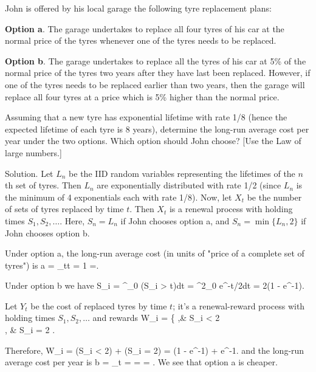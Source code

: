 \begin{exercise}
John is offered by his local garage the following tyre replacement plans: 

{\bf Option a}. The garage undertakes to replace all four tyres of his car at the normal price of the tyres whenever one of the tyres needs to be replaced. 

{\bf Option b}. The garage undertakes to replace all the tyres of his car at 5\% of the normal price of the tyres two years after they have last been replaced. However, if one of the tyres needs to be replaced earlier than two years, then the garage will replace all four tyres at a price which is 5\% higher than the normal price. 

Assuming that a new tyre has exponential lifetime with rate 1/8 (hence the expected lifetime of each tyre is 8 years), determine the long-run average cost per year under the two options. Which option should John choose? [Use the Law of large numbers.]
\end{exercise}


Solution. Let $L_n$ be the IID random variables representing the lifetimes of the $n$th set of tyres. Then $L_n$ are exponentially distributed with rate 1/2 (since $L_n$ is the minimum of 4 exponentials each with rate 1/8). Now, let $X_t$ be the number of sets of tyres replaced by time $t$. Then $X_t$ is a renewal process with holding times $S_1, S_2, \dots$. Here, $S_n = L_n$ if John chooses option a, and $S_n = \min\{L_n, 2\}$ if John chooses option b. 

Under option a, the long-run average cost (in units of "price of a complete set of tyres") is
\be
a = \lim_{t\to \infty}t = 1 =.
\ee

Under option b we have
\be
\E S_i = \int^\infty_0 \pro(S_i > t)dt = \int^2_0 e^{-t/2}dt = 2(1 - e^{-1}).
\ee

Let $Y_t$ be the cost of replaced tyres by time $t$; it's a renewal-reward process with holding times $S_1, S_2,\dots$ and rewards
\be
W_i = \left\{
,\quad\quad & S_i < 2\\
, & S_i = 2
\ea\right.
\ee

Therefore,
\be
\E W_i = \pro(S_i < 2) +  \pro(S_i = 2) =  (1 - e^{-1}) +  e^{-1}.
\ee
and the long-run average cost per year is
\be
b = \lim_{t\to\infty}  = =  =  .
\ee
We see that option a is cheaper.

